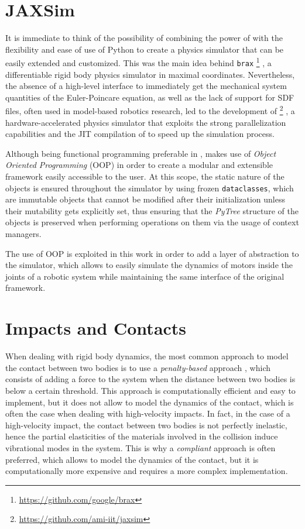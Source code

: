 \section{JAXSim}

It is immediate to think of the possibility of combining the power of \jax with the flexibility and ease of use of Python to create a physics simulator that can be easily extended and customized. This was the main idea behind \texttt{brax} \footnote{\url{https://github.com/google/brax}} \citep{freeman_brax_2021}, a differentiable rigid body physics simulator in maximal coordinates. Nevertheless, the absence of a high-level interface to immediately get the mechanical system quantities of the Euler-Poincare equation, as well as the lack of support for \ac{SDF} files, often used in model-based robotics research, led to the development of \jaxsim \footnote{\url{https://github.com/ami-iit/jaxsim}} \citep{ferigo_jaxsim_2022}, a hardware-accelerated physics simulator that exploits the strong parallelization capabilities and the \ac{JIT} compilation of \jax to speed up the simulation process.

Although being functional programming preferable in \jax, \jaxsim makes use of \textit{Object Oriented Programming} (\ac{OOP}) in order to create a modular and extensible framework easily accessible to the user. At this scope, the static nature of the objects is ensured throughout the simulator by using frozen \texttt{dataclasses}, which are immutable objects that cannot be modified after their initialization unless their mutability gets explicitly set, thus ensuring that the \textit{PyTree} structure of the objects is preserved when performing operations on them via the usage of context managers.

The use of \ac{OOP} is exploited in this work in order to add a layer of abstraction to the simulator, which allows to easily simulate the dynamics of motors inside the joints of a robotic system while maintaining the same interface of the original \jaxsim framework.


\section{Impacts and Contacts}
\label{sec:back_contacts}

When dealing with rigid body dynamics, the most common approach to model the contact between two bodies is to use a \textit{penalty-based} approach \citep{inproceedings}, which consists of adding a force to the system when the distance between two bodies is below a certain threshold. This approach is computationally efficient and easy to implement, but it does not allow to model the dynamics of the contact, which is often the case when dealing with high-velocity impacts. In fact, in the case of a high-velocity impact, the contact between two bodies is not perfectly inelastic, hence the partial elasticities of the materials involved in the collision induce vibrational modes in the system. This is why a \textit{compliant} approach is often preferred, which allows to model the dynamics of the contact, but it is computationally more expensive and requires a more complex implementation.

